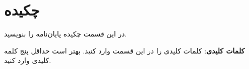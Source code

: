 \clearpage
\section*{چکیده}
در این قسمت چکیده پایان‌نامه را بنویسید.

\vskip 5mm
\noindent\textbf{کلمات کلیدی}: 
کلمات کلیدی را در این قسمت وارد کنید. بهتر است حداقل پنج کلمه کلیدی وارد کنید.